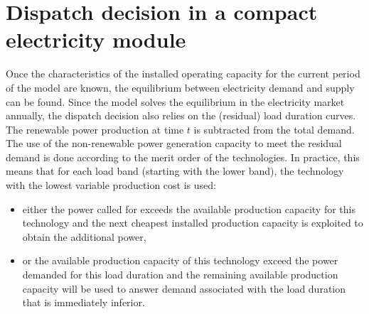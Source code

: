 \section{Dispatch decision in a compact electricity module}




Once the characteristics of the installed operating capacity for the current period of the model are known, the equilibrium between electricity demand and supply can be found.
Since the model solves the equilibrium in the electricity market annually, the dispatch decision also relies on the (residual) load duration curves. The renewable power production at time $t$ is subtracted from the total demand.
The use of the non-renewable power generation capacity to meet the residual demand is done according to the merit order of the technologies.
In practice, this means that for each load band (starting with the lower band), the technology with the lowest variable production cost is used:


\begin{itemize}
    \item either the power called for exceeds the available production capacity for this technology and the next cheapest installed production capacity is exploited to obtain the additional power,
    \item or the available production capacity of this technology exceed the power demanded for this load duration and the remaining available production capacity will be used to answer demand associated with the load duration that is immediately inferior.
\end{itemize}

